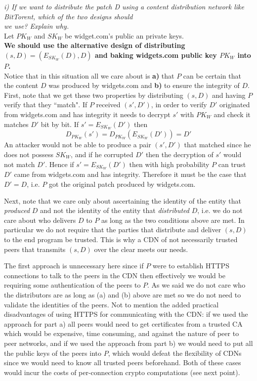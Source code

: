 \textit{i) If we want to distribute the patch D using a content distribution network like BitTorent, which of the two designs should\\\indent we use? Explain why.}\\

\noindent Let $PK_W$ and $SK_W$ be widget.com's public an private keys.\\

\noindent \textbf{We should use the alternative design of distributing $(s, D) = (E_{SK_W}(D), D)$ and baking widgets.com public key $PK_W$ into $P$.}\\ 

Notice that in this situation all we care about is \textbf{a)} that $P$ can be certain that the content $D$ was produced by widgets.com and \textbf{b)} to ensure the integrity of $D$. First, note that we get these two properties by distributing $(s, D)$ and having $P$ verify that they ``match". If $P$ received $(s', D')$, in order to verify $D'$ originated from widgets.com and has integrity it needs to decrypt $s'$ with $PK_W$ and check it matches $D'$ bit by bit. If $s' = E_{SK_W}(D')$ then 
\[
D_{PK_W}(s') = D_{PK_W}(E_{SK_W}(D')) = D'
\]
An attacker would not be able to produce a pair $(s', D')$ that matched since he does not possess $SK_W$, and if he corrupted $D'$ then the decryption of $s'$ would not match $D'$. Hence if $s' = E_{SK_W}(D')$ then with high probability $P$ can trust $D'$ came from widgets.com and has integrity. Therefore it must be the case that $D' = D$, i.e. $P$ got the original patch produced by widgets.com.

Next, note that we care only about ascertaining the identity of the entity that \textit{produced} $D$ and not the identity of the entity that \textit{distributed} $D$, i.e. we do not care about who delivers $D$ to $P$ as long as the two conditions above are met. In particular we do not require that the parties that distribute and deliver $(s, D)$ to the end program be trusted. This is why a CDN of not necessarily trusted peers that transmits $(s, D)$ over the clear meets our needs. 

The first approach is unnecessary here since if $P$ were to establish HTTPS connections to talk to the peers in the CDN then effectively we would be requiring some authentication of the peers to $P$. As we said we do not care who the distributors are as long as (a) and (b) above are met so we do not need to validate the identities of the peers. Not to mention the added practical disadvantages of using HTTPS  for communicating with the CDN: if we used the approach for part a) all peers would need to get certificates from a trusted CA which would be expensive, time consuming, and against the nature of peer to peer networks, and if we used the approach from part b) we would need to put all the public keys of the peers into $P$, which would defeat the flexibility of CDNs since we would need to know all trusted peers beforehand. Both of these cases would incur the costs of per-connection crypto computations (see next point).\\

